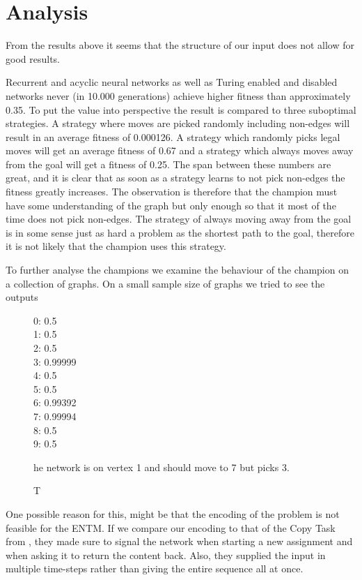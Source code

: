 
\section{Analysis}
From the results above it seems that the structure of our input does not allow for good results.

\newpar Recurrent and acyclic neural networks as well as Turing enabled and disabled networks never (in 10.000 generations) achieve higher fitness than approximately 0.35. To put the value into perspective the result is compared to three suboptimal strategies. A strategy where moves are picked randomly including non-edges will result in an average fitness of 0.000126. A strategy which randomly picks legal moves will get an average fitness of 0.67 and a strategy which always moves away from the goal will get a fitness of 0.25. The span between these numbers are great, and it is clear that as soon as a strategy learns to not pick non-edges the fitness greatly increases. The observation is therefore that the champion must have some understanding of the graph but only enough so that it most of the time does not pick non-edges. The strategy of always moving away from the goal is in some sense just as hard a problem as the shortest path to the goal, therefore it is not likely that the champion uses this strategy. 

To further analyse the champions we examine the behaviour of the champion on a collection of graphs. On a small sample size of graphs we tried to see the outputs 

\begin{figure}
	0:	0.5 \\
	1:	0.5	\\
	2:	0.5	\\
	3:	0.99999 \\
	4:	0.5	\\
	5:	0.5	\\
	6:	0.99392 \\
	7:	0.99994 \\
	8:	0.5	\\
	9:	0.5 \\
	\caption The network is on vertex 1 and should move to 7 but picks 3.
\end{figure}

\newpar One possible reason for this, might be that the encoding of the problem is not feasible for the ENTM. If we compare our encoding to that of the Copy Task from \cite{greve2016evolving}, they made sure to signal the network when starting a new assignment and when asking it to return the content back. Also, they supplied the input in multiple time-steps rather than giving the entire sequence all at once.

